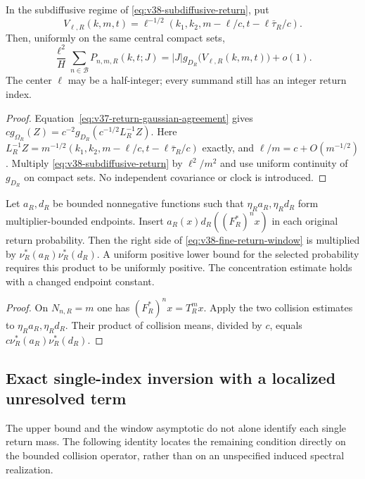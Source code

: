 \begin{corollary}
\label{cor:v38-return-normalization}
In the subdiffusive regime of \eqref{eq:v38-subdiffusive-return}, put
\[
 V_{\ell,R}(k,m,t)
  =\ell^{-1/2}(k_1,k_2,m-\ell/c,t-\ell\bar\tau_R/c).
\]
Then, uniformly on the same central compact sets,
\begin{equation}\label{eq:v38-original-normalization}
 \frac{\ell^2}{H}\sum_{n\in\mathcal B}P_{n,m,R}(k,t;J)
       =|J|g_{D_R}\bigl(V_{\ell,R}(k,m,t)\bigr)+o(1).
\end{equation}
The center $\ell$ may be a half-integer; every summand still has an
integer return index.
\end{corollary}
\begin{proof}
Equation~\eqref{eq:v37-return-gaussian-agreement} gives
$c g_{\Omega_R}(Z)=c^{-2}g_{D_R}(c^{-1/2}L_R^{-1}Z)$.
Here $L_R^{-1}Z=m^{-1/2}(k_1,k_2,m-\ell/c,t-\ell\bar\tau_R/c)$
exactly, and $\ell/m=c+O(m^{-1/2})$. Multiply
\eqref{eq:v38-subdiffusive-return} by $\ell^2/m^2$ and use uniform
continuity of $g_{D_R}$ on compact sets. No independent covariance
or clock is introduced.
\end{proof}

\begin{corollary}
\label{cor:v38-selected-return-window}
Let $a_R,d_R$ be bounded nonnegative functions such that
$\eta_Ra_R,\eta_Rd_R$ form multiplier-bounded endpoints.
Insert $a_R(x)d_R((F_R^*)^nx)$ in each original return probability.
Then the right side of \eqref{eq:v38-fine-return-window} is multiplied
by $\nu_R^*(a_R)\nu_R^*(d_R)$. A uniform positive lower bound for the
selected probability requires this product to be uniformly positive.
The concentration estimate holds with a changed endpoint constant.
\end{corollary}
\begin{proof}
On $N_{n,R}=m$ one has $(F_R^*)^nx=T_R^mx$. Apply the two collision
estimates to $\eta_Ra_R,\eta_Rd_R$. Their product of collision means,
divided by $c$, equals $c\nu_R^*(a_R)\nu_R^*(d_R)$.
\end{proof}

\subsection{Exact single-index inversion with a localized unresolved term}
The upper bound and the window asymptotic do not alone identify each
single return mass. The following identity locates the remaining
condition directly on the bounded collision operator, rather than on
an unspecified induced spectral realization.

